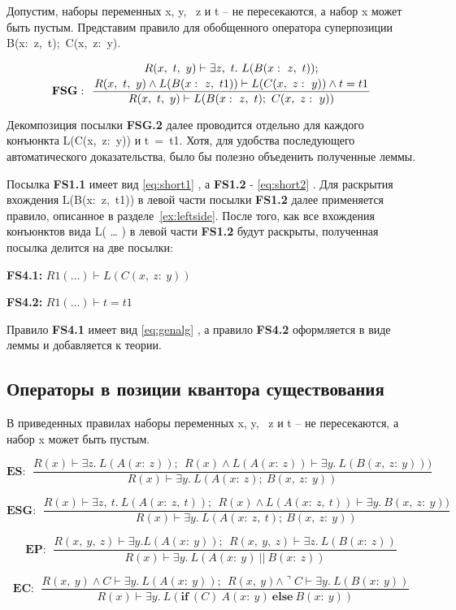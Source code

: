 \documentclass[10pt,a4paper]{article}
\newcommand{\ruleI}[3] {
$$
\mathbf{#1:} ~~
\frac{#2}{#3}
$$
}
\newcommand{\ruleII}[4] {
\ruleI{#1}
{\genfrac{}{}{0pt}{0}{#2}{#3}}
{#4}
}
\newcommand{\lnkformula}[1] {
\eqref{eq:#1}
}
\begin{document}
Допустим, наборы переменных x, y,  z и t – не пересекаются, а набор x может быть пустым. Представим правило для обобщенного оператора суперпозиции B(x: z, t); C(x, z: y).

\ruleII{FSG}
{R(x,~t,~y) \vdash \exists z,~t.~L(B(x:~z,~t));}
{R(x,~t,~y) \land L(B(x:~z,~t1)) \vdash L(C(x,~z:~y)) \land t = t1}
{R(x,~t,~y) \vdash L(B(x:~z,~t);~C(x,~z:~y))}

Декомпозиция посылки \textbf{FSG.2} далее проводится отдельно для каждого конъюнкта L(C(x, z: y)) и t = t1. Хотя, для удобства последующего автоматического доказательства, было бы полезно объеденить полученные леммы.

Посылка \textbf{FS1.1} имеет вид \lnkformula{short1}, а \textbf{FS1.2} - \lnkformula{short2}. Для раскрытия вхождения L(B(x: z, t1)) в левой части посылки \textbf{FS1.2} далее применяется правило, описанное в разделе~\ref{ex:leftside}. После того, как все вхождения конъюнктов вида L( … ) в левой части \textbf{FS1.2} будут раскрыты, полученная посылка делится на две посылки:

\textbf{FS4.1:} $ R1(…) \vdash L(C(x,~z:~y)) $
\par\textbf{FS4.2:} $ R1(…) \vdash t = t1 $

Правило \textbf{FS4.1} имеет вид \lnkformula{genalg}, а правило \textbf{FS4.2} оформляется в виде леммы и добавляется к теории.

\subsection{Операторы в позиции квантора существования}

В приведенных правилах наборы переменных x, y,  z и t – не пересекаются, а набор x может быть пустым.

\ruleI{ES}
{R(x) \vdash \exists z.~L(A(x:~z));~~R(x) \land L(A(x:~z)) \vdash \exists y.~L(B(x,~z:~y)))}
{R(x) \vdash \exists y.~L(A(x:~z);~B(x,~z:~y))}

\ruleI{ESG}
{R(x) \vdash \exists z,~t.~L(A(x:~z,~t));~~R(x) \land L(A(x:~z,~t)) \vdash \exists y.~B(x,~z:~y))}
{R(x) \vdash \exists y.~L(A(x:~z,~t);~B(x,~z:~y))}

\ruleI{EP}
{R(x,~y,~z) \vdash \exists y. L(A(x:~y));~~R(x,~y,~z) \vdash \exists z.~L(B(x:~z))}
{R(x) \vdash \exists y.~L(A(x:~y)~||~B(x:~z))}

\ruleI{EC}
{R(x,~y) \land C \vdash \exists y.~L (A(x:~y));~~R(x,~y) \land \urcorner C \vdash \exists y.~L(B(x:~y))}
{R(x) \vdash \exists y.~L(\mathbf{if}~(C)~A(x:~y)~\mathbf{else}~B(x:~y))}
\end{document}
